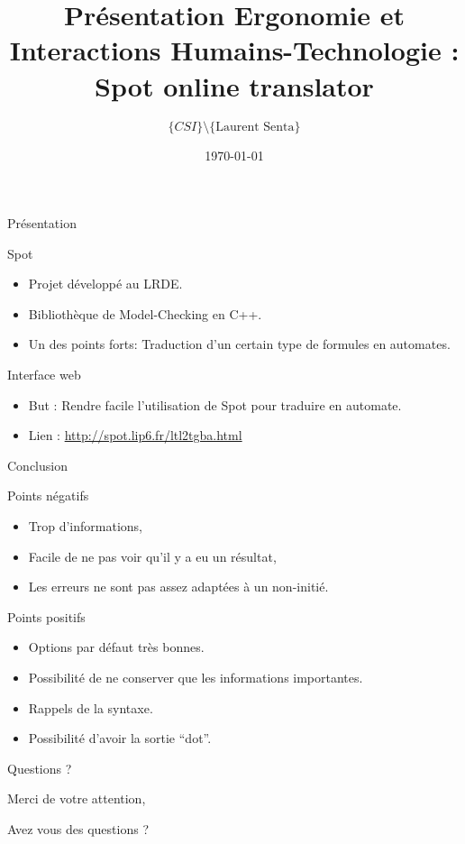 \documentclass{beamer}
\author {$\{CSI\} \setminus \{\text{Laurent Senta}\}$}
\date\today
\title[Ergonomie: Spot online ]{Présentation Ergonomie et Interactions Humains-Technologie : \og Spot online translator\fg}
\institute{Epita - CSI}
\begin{document}
\begin{frame}
  \maketitle
\end{frame}


\begin{frame}{Présentation}
  \begin{block}{Spot}
    \begin{itemize}
    \item Projet développé au LRDE.
    \item Bibliothèque de Model-Checking en C++.
    \item Un des points forts: Traduction d'un certain type de formules
      en automates.
    \end{itemize}
  \end{block}

  \begin{block}{Interface web}
    \begin{itemize}
    \item But : Rendre facile l'utilisation de Spot pour traduire en
      automate.
    \item Lien : \url{http://spot.lip6.fr/ltl2tgba.html}
    \end{itemize}
  \end{block}
\end{frame}












\begin{frame}{Conclusion}
  \begin{block}{Points négatifs}
    \begin{itemize}
    \item Trop d'informations,
    \item Facile de ne pas voir qu'il y a eu un résultat,
    \item Les erreurs ne sont pas assez adaptées à un non-initié.
    \end{itemize}
  \end{block}

  \begin{block}{Points positifs}
    \begin{itemize}
    \item Options par défaut très bonnes.
    \item Possibilité de ne conserver que les informations importantes.
    \item Rappels de la syntaxe.
    \item Possibilité d'avoir la sortie ``dot''.
    \end{itemize}
  \end{block}
\end{frame}

\begin{frame}{Questions ?}

  Merci de votre attention,

  Avez vous des questions ?
\end{frame}
\end{document}
